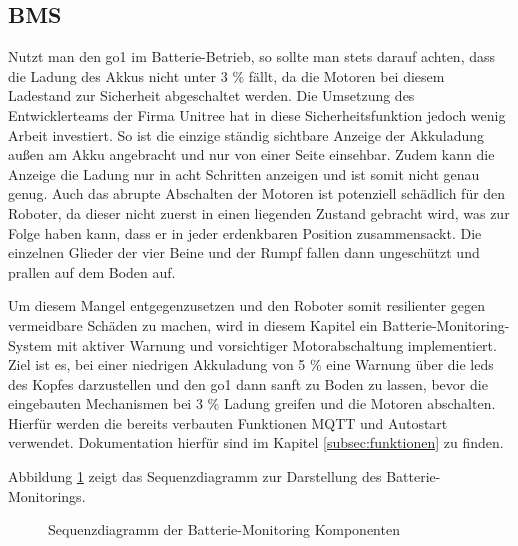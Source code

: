 \subsection{BMS}
\label{subsec:bms-monitor}

Nutzt man den \gls{go1} im Batterie-Betrieb, so sollte man stets darauf achten, dass die Ladung des Akkus nicht unter
\num{3} \% fällt, da die Motoren bei diesem Ladestand zur Sicherheit abgeschaltet werden.
Die Umsetzung des Entwicklerteams der Firma Unitree hat in diese Sicherheitsfunktion jedoch wenig Arbeit investiert.
So ist die einzige ständig sichtbare Anzeige der Akkuladung außen am Akku angebracht und nur von einer Seite einsehbar.
Zudem kann die Anzeige die Ladung nur in acht Schritten anzeigen und ist somit nicht genau genug.
Auch das abrupte Abschalten der Motoren ist potenziell schädlich für den Roboter, da dieser nicht zuerst in einen liegenden
Zustand gebracht wird, was zur Folge haben kann, dass er in jeder erdenkbaren Position zusammensackt.
Die einzelnen Glieder der vier Beine und der Rumpf fallen dann ungeschützt und prallen auf dem Boden auf.

Um diesem Mangel entgegenzusetzen und den Roboter somit resilienter gegen vermeidbare Schäden zu machen, wird in diesem
Kapitel ein Batterie-Monitoring-System mit aktiver Warnung und vorsichtiger Motorabschaltung implementiert.
Ziel ist es, bei einer niedrigen Akkuladung von \num{5} \% eine Warnung über die \glspl{led} des Kopfes darzustellen und den
\gls{go1} dann sanft zu Boden zu lassen, bevor die eingebauten Mechanismen bei \num{3} \% Ladung greifen und die Motoren
abschalten.
Hierfür werden die bereits verbauten Funktionen MQTT und Autostart verwendet.
Dokumentation hierfür sind im Kapitel \ref{subsec:funktionen} zu finden.


Abbildung \ref{fig:sequenz-bms} zeigt das Sequenzdiagramm zur Darstellung des Batterie-Monitorings.

\begin{figure}[h]
    \caption{Sequenzdiagramm der Batterie-Monitoring Komponenten}\label{fig:sequenz-bms}
\end{figure}

